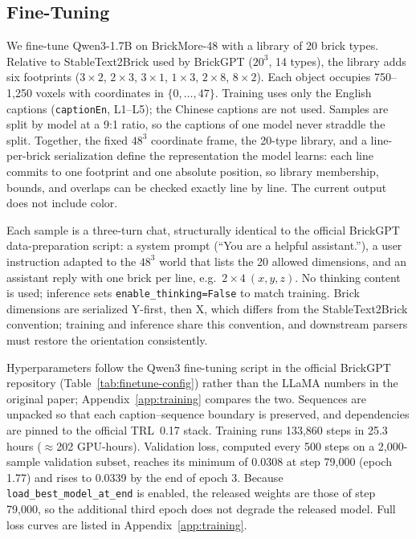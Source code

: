 \documentclass[letterpaper]{article} %
\begin{document}
\subsection{Fine-Tuning}
\label{sec:training}
We fine-tune Qwen3-1.7B on BrickMore-48 with a library of 20 brick types. Relative to StableText2Brick used by BrickGPT ($20^3$, 14 types), the library adds six footprints ($3{\times}2$, $2{\times}3$, $3{\times}1$, $1{\times}3$, $2{\times}8$, $8{\times}2$). Each object occupies 750--1,250 voxels with coordinates in $\{0,\ldots,47\}$. Training uses only the English captions (\texttt{captionEn}, L1--L5); the Chinese captions are not used. Samples are split by model at a 9:1 ratio, so the captions of one model never straddle the split. Together, the fixed $48^3$ coordinate frame, the 20-type library, and a line-per-brick serialization define the representation the model learns: each line commits to one footprint and one absolute position, so library membership, bounds, and overlaps can be checked exactly line by line. The current output does not include color.

Each sample is a three-turn chat, structurally identical to the official BrickGPT data-preparation script: a system prompt (``You are a helpful assistant.''), a user instruction adapted to the $48^3$ world that lists the 20 allowed dimensions, and an assistant reply with one brick per line, e.g.\ $2{\times}4\ (x,y,z)$. No thinking content is used; inference sets \texttt{enable\_thinking=False} to match training. Brick dimensions are serialized Y-first, then X, which differs from the StableText2Brick convention; training and inference share this convention, and downstream parsers must restore the orientation consistently.

Hyperparameters follow the Qwen3 fine-tuning script in the official BrickGPT repository (Table~\ref{tab:finetune-config}) rather than the LLaMA numbers in the original paper; Appendix~\ref{app:training} compares the two. Sequences are unpacked so that each caption--sequence boundary is preserved, and dependencies are pinned to the official TRL~0.17 stack. Training runs 133,860 steps in 25.3 hours ($\approx$202 GPU-hours). Validation loss, computed every 500 steps on a 2,000-sample validation subset, reaches its minimum of 0.0308 at step 79,000 (epoch 1.77) and rises to 0.0339 by the end of epoch 3. Because \texttt{load\_best\_model\_at\_end} is enabled, the released weights are those of step 79,000, so the additional third epoch does not degrade the released model. Full loss curves are listed in Appendix~\ref{app:training}.
\end{document}
